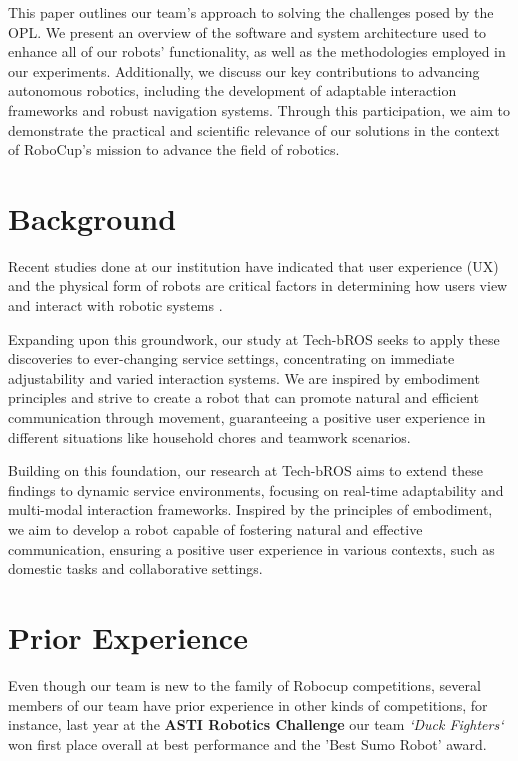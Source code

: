 \documentclass[runningheads,a4paper]{llncs}
\begin{document}
This paper outlines our team’s approach to solving the challenges posed by the OPL. We present an overview of the software and system architecture used to enhance all of our robots' functionality, as well as the methodologies employed in our experiments. Additionally, we discuss our key contributions to advancing autonomous robotics, including the development of adaptable interaction frameworks and robust navigation systems. Through this participation, we aim to demonstrate the practical and scientific relevance of our solutions in the context of RoboCup’s mission to advance the field of robotics.


\section{Background}

Recent studies done at our institution have indicated that user experience (UX) and the physical form of robots are critical factors in determining how users view and interact with robotic systems \cite{corrales2023embodiment}.

Expanding upon this groundwork, our study at Tech-bROS seeks to apply these discoveries to ever-changing service settings, concentrating on immediate adjustability and varied interaction systems. We are inspired by embodiment principles and strive to create a robot that can promote natural and efficient communication through movement, guaranteeing a positive user experience in different situations like household chores and teamwork scenarios. 

Building on this foundation, our research at Tech-bROS aims to extend these findings to dynamic service environments, focusing on real-time adaptability and multi-modal interaction frameworks. Inspired by the principles of embodiment, we aim to develop a robot capable of fostering natural and effective communication, ensuring a positive user experience in various contexts, such as domestic tasks and collaborative settings.

\section{Prior Experience}
Even though our team is new to the family of Robocup competitions, several members of our team have prior experience in other kinds of competitions, for instance, last year at the \textbf{ASTI Robotics Challenge} our team \textit{`Duck Fighters`} won first place overall at best performance and the 'Best Sumo Robot' award.\cite{ASTIRobotics2024} \
\end{document}
